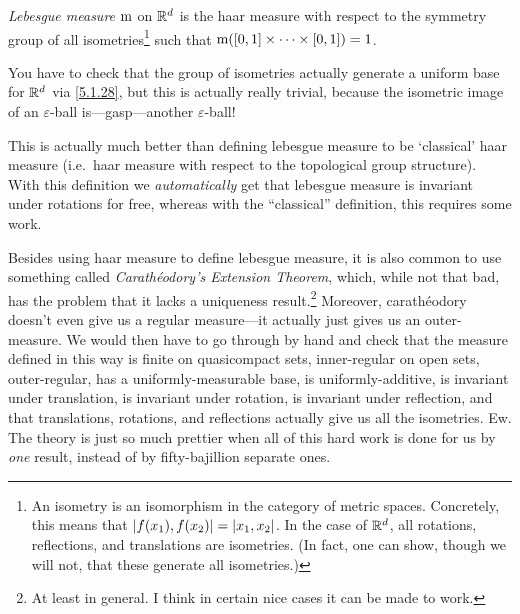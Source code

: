 \begin{dfn}\label{LebesgueMeasure}
\emph{Lebesgue measure} $\mathrm{m}$ on $\mathbb{R} ^d$ is the haar measure with respect to the symmetry group of all isometries\footnote{An isometry is an isomorphism in the category of metric spaces.  Concretely, this means that $\metric[f(x_1)][f(x_2)]=\metric[x_1][x_2]$.  In the case of $\mathbb{R} ^d$, all rotations, reflections, and translations are isometries.  (In fact, one can show, though we will not, that these generate all isometries.)} such that $\mathrm{m} ([0,1]\times \cdots \times [0,1])=1$.
\begin{rmk}
You have to check that the group of isometries actually generate a uniform base for $\mathbb{R} ^d$ via \eqref{5.1.28}, but this is actually really trivial, because the isometric image of an $\varepsilon$-ball is---gasp---another $\varepsilon$-ball!
\end{rmk}
\begin{rmk}
This is actually much better than defining lebesgue measure to be `classical' haar measure (i.e.~haar measure with respect to the topological group structure).  With this definition we \emph{automatically} get that lebesgue measure is invariant under rotations for free, whereas with the ``classical'' definition, this requires some work.
\end{rmk}
\begin{rmk}
Besides using haar measure to define lebesgue measure, it is also common to use something called \emph{Carath\'{e}odory's Extension Theorem}, which, while not that bad, has the problem that it lacks a uniqueness result.\footnote{At least in general.  I think in certain nice cases it can be made to work.}  Moreover, carath\'{e}odory doesn't even give us a regular measure---it actually just gives us an outer-measure.  We would then have to go through by hand and check that the measure defined in this way is finite on quasicompact sets, inner-regular on open sets, outer-regular, has a uniformly-measurable base, is uniformly-additive, is invariant under translation, is invariant under rotation, is invariant under reflection, and that translations, rotations, and reflections actually give us all the isometries.  Ew.  The theory is just so much prettier when all of this hard work is done for us by \emph{one} result, instead of by fifty-bajillion separate ones.
\end{rmk}
\end{dfn}


